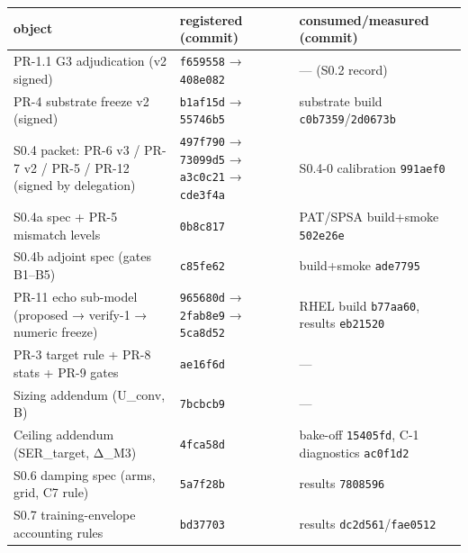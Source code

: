 \documentclass[
  10pt,
]{article}
\newcounter{none} %
\begin{document}
{\def\LTcaptype{none} %
\begin{longtable}[]{@{}
  >{\raggedright\arraybackslash}p{}
  >{\raggedright\arraybackslash}p{}
  >{\raggedright\arraybackslash}p{}@{}}
\toprule\noalign{}
\begin{minipage}[b]{\linewidth}\raggedright
object
\end{minipage} & \begin{minipage}[b]{\linewidth}\raggedright
registered (commit)
\end{minipage} & \begin{minipage}[b]{\linewidth}\raggedright
consumed/measured (commit)
\end{minipage} \\
\midrule\noalign{}
\endhead
\bottomrule\noalign{}
\endlastfoot
PR-1.1 G3 adjudication (v2 signed) & \texttt{f659558} → \texttt{408e082}
& --- (S0.2 record) \\
PR-4 substrate freeze v2 (signed) & \texttt{b1af15d} → \texttt{55746b5}
& substrate build \texttt{c0b7359}/\texttt{2d0673b} \\
S0.4 packet: PR-6 v3 / PR-7 v2 / PR-5 / PR-12 (signed by delegation) &
\texttt{497f790} → \texttt{73099d5} → \texttt{a3c0c21} →
\texttt{cde3f4a} & S0.4-0 calibration \texttt{991aef0} \\
S0.4a spec + PR-5 mismatch levels & \texttt{0b8c817} & PAT/SPSA
build+smoke \texttt{502e26e} \\
S0.4b adjoint spec (gates B1--B5) & \texttt{c85fe62} & build+smoke
\texttt{ade7795} \\
PR-11 echo sub-model (proposed → verify-1 → numeric freeze) &
\texttt{965680d} → \texttt{2fab8e9} → \texttt{5ca8d52} & RHEL build
\texttt{b77aa60}, results \texttt{eb21520} \\
PR-3 target rule + PR-8 stats + PR-9 gates & \texttt{ae16f6d} & --- \\
Sizing addendum (U\_conv, B) & \texttt{7bcbcb9} & --- \\
Ceiling addendum (SER\_target, Δ\_M3) & \texttt{4fca58d} & bake-off
\texttt{15405fd}, C-1 diagnostics \texttt{ac0f1d2} \\
S0.6 damping spec (arms, grid, C7 rule) & \texttt{5a7f28b} & results
\texttt{7808596} \\
S0.7 training-envelope accounting rules & \texttt{bd37703} & results
\texttt{dc2d561}/\texttt{fae0512} \\

\end{longtable}}
\end{document}
